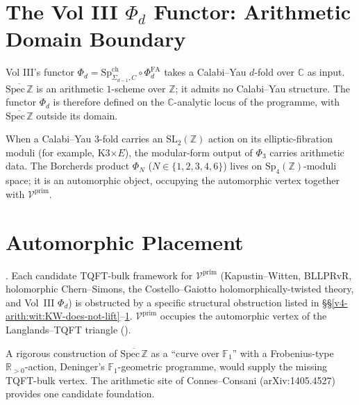 \section{The Vol III \(\Phi_{d}\) Functor: Arithmetic Domain Boundary}
\label{v4-arith:wit:vol3-obstruction}

\begin{observation}
\label{v4-arith:obs:vol3-obstruction}
Vol III's functor
\(\Phi_{d}=\mathrm{Sp}^{\mathrm{ch}}_{\Sigma_{d-1},C}\circ\Phi^{\mathrm{FA}}_{d}\)
takes a Calabi--Yau \(d\)-fold over \(\mathbb{C}\) as input.
\(\overline{\mathrm{Spec}\,\mathbb{Z}}\) is an arithmetic \(1\)-scheme
over \(\mathbb{Z}\); it admits no Calabi--Yau structure. The functor
\(\Phi_{d}\) is therefore defined on the \(\mathbb{C}\)-analytic locus
of the programme, with \(\overline{\mathrm{Spec}\,\mathbb{Z}}\) outside
its domain.
\end{observation}

\begin{remark}
When a Calabi--Yau \(3\)-fold carries an \(\mathrm{SL}_{2}(\mathbb{Z})\)
action on its elliptic-fibration moduli (for example, K3\(\times E\)),
the modular-form output of \(\Phi_{3}\) carries arithmetic data.
The Borcherds product \(\Phi_{N}\) (\(N\in\{1,2,3,4,6\}\)) lives on
\(\mathrm{Sp}_{4}(\mathbb{Z})\)-moduli space; it is an automorphic
object, occupying the automorphic vertex together with
\(\mathcal{V}^{\mathrm{prim}}\).
\end{remark}

\section{Automorphic Placement}
\label{v4-arith:wit:conclusion-automorphic}

\begin{theorem}
\label{v4-arith:thm:witten-conclusion}
\ClaimStatusProvedHere. Each candidate TQFT-bulk framework for
\(\mathcal{V}^{\mathrm{prim}}\) (Kapustin--Witten, BLLPRvR,
holomorphic Chern--Simons, the Costello--Gaiotto holomorphically-twisted
theory, and Vol~III \(\Phi_{d}\)) is obstructed by a specific structural
obstruction listed in
\S\S\ref{v4-arith:wit:KW-does-not-lift}--\ref{v4-arith:wit:vol3-obstruction}. \(\mathcal{V}^{\mathrm{prim}}\) occupies
the automorphic vertex of the Langlands--TQFT triangle
().
\end{theorem}

\begin{remark}
A rigorous construction of \(\overline{\mathrm{Spec}\,\mathbb{Z}}\)
as a ``curve over \(\mathbb{F}_{1}\)'' with a Frobenius-type
\(\mathbb{R}_{>0}\)-action, Deninger's \(\mathbb{F}_{1}\)-geometric
programme, would supply the missing TQFT-bulk vertex. The arithmetic
site of Connes--Consani (arXiv:1405.4527) provides one candidate
foundation.
\end{remark}

